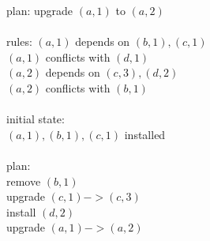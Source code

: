 \documentclass[a4paper,11pt]{article}
\begin{document}
plan: upgrade $(a,1)$ to $(a,2)$\\
\\
rules:
  $(a,1)$ depends on $(b,1), (c,1)$ \\
  $(a,1)$ conflicts with $(d,1)$\\
  $(a,2)$ depends on $(c,3), (d,2)$\\
  $(a,2)$ conflicts with $(b,1)$\\
\\
initial state:\\
  $(a,1), (b,1), (c,1)$ installed \\
\\
plan:\\
  remove $(b,1)$\\
  upgrade $(c,1) -> (c,3)$\\
  install $(d,2)$\\
  upgrade $(a,1) -> (a,2)$\\
\end{document}
